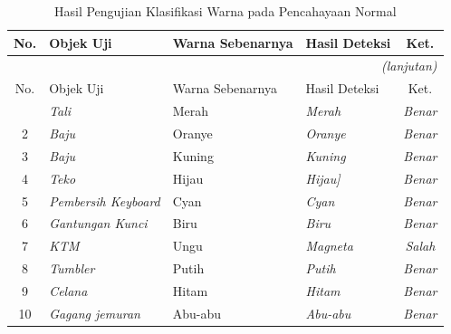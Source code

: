 \begin{longtable}{|c|>{\raggedright\arraybackslash}p{3cm}|>{\raggedright\arraybackslash}p{2.8cm}|>{\raggedright\arraybackslash}p{2.8cm}|c|}
  \caption{Hasil Pengujian Klasifikasi Warna pada Pencahayaan Normal}
  \label{tab:akurasi-normal} \\
  \hline
  No. & Objek Uji & Warna Sebenarnya & Hasil Deteksi & Ket. \\
  \hline
  \endfirsthead
  \multicolumn{5}{r}{\textit{(lanjutan)}} \\
  \hline
  No. & Objek Uji & Warna Sebenarnya & Hasil Deteksi & Ket. \\
  \hline
  \endhead
  \hline
  \endfoot
  1  & \textit{Tali} & Merah   & \textit{Merah} & \textit{Benar} \\ \hline
  2  & \textit{Baju} & Oranye   & \textit{Oranye} & \textit{Benar} \\ \hline
  3  & \textit{Baju} & Kuning  & \textit{Kuning} & \textit{Benar} \\ \hline
  4  & \textit{Teko} & Hijau   & \textit{Hijau]} & \textit{Benar} \\ \hline
  5  & \textit{Pembersih Keyboard} & Cyan    & \textit{Cyan} & \textit{Benar} \\ \hline
  6  & \textit{Gantungan Kunci} & Biru    & \textit{Biru} & \textit{Benar} \\ \hline
  7  & \textit{KTM} & Ungu    & \textit{Magneta} & \textit{Salah} \\ \hline
  8  & \textit{Tumbler} & Putih   & \textit{Putih} & \textit{Benar} \\ \hline
  9  & \textit{Celana} & Hitam   & \textit{Hitam} & \textit{Benar} \\ \hline
  10 & \textit{Gagang jemuran} & Abu-abu & \textit{Abu-abu} & \textit{Benar} \\ \hline
\end{longtable}

